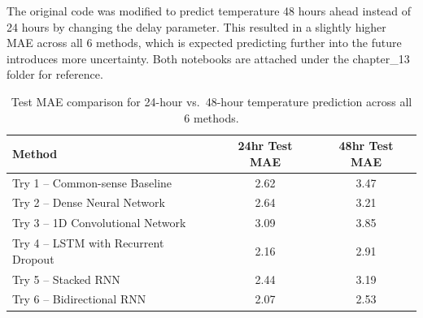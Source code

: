 \documentclass[11pt]{article}
\begin{document}
The original code was modified to predict temperature 48 hours ahead instead of 24 hours by changing the delay parameter. This resulted in a slightly higher MAE across all 6 methods, which is expected predicting further into the future introduces more uncertainty. Both notebooks are attached under the chapter\_13 folder for reference.

\begin{table}[H]
\centering
\begin{tabular}{lcc}
\toprule
\textbf{Method} & \textbf{24hr Test MAE} & \textbf{48hr Test MAE} \\
\midrule
Try 1 -- Common-sense Baseline       & 2.62 & 3.47 \\
Try 2 -- Dense Neural Network        & 2.64 & 3.21 \\
Try 3 -- 1D Convolutional Network    & 3.09 & 3.85 \\
Try 4 -- LSTM with Recurrent Dropout & 2.16 & 2.91 \\
Try 5 -- Stacked RNN                 & 2.44 & 3.19 \\
Try 6 -- Bidirectional RNN           & 2.07 & 2.53 \\
\bottomrule
\end{tabular}
\caption{Test MAE comparison for 24-hour vs.\ 48-hour temperature prediction across all 6 methods.}
\end{table}
\end{document}

